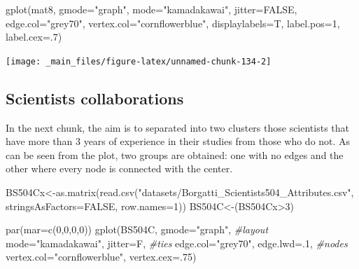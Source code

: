\documentclass[
  notitlepage,
  onecolumn,
  openany]{book}
\newenvironment{Shaded}{\begin{snugshade}}{\end{snugshade}}
\newcommand{\AttributeTok}[1]{\textcolor[rgb]{0.77,0.63,0.00}{#1}}
\newcommand{\CommentTok}[1]{\textcolor[rgb]{0.56,0.35,0.01}{\textit{#1}}}
\newcommand{\ConstantTok}[1]{\textcolor[rgb]{0.00,0.00,0.00}{#1}}
\newcommand{\DecValTok}[1]{\textcolor[rgb]{0.00,0.00,0.81}{#1}}
\newcommand{\FunctionTok}[1]{\textcolor[rgb]{0.00,0.00,0.00}{#1}}
\newcommand{\NormalTok}[1]{#1}
\newcommand{\OtherTok}[1]{\textcolor[rgb]{0.56,0.35,0.01}{#1}}
\newcommand{\SpecialCharTok}[1]{\textcolor[rgb]{0.00,0.00,0.00}{#1}}
\newcommand{\StringTok}[1]{\textcolor[rgb]{0.31,0.60,0.02}{#1}}
\begin{document}
\begin{Shaded}
\begin{Highlighting}[]
\FunctionTok{gplot}\NormalTok{(mat8, }
      \AttributeTok{gmode=}\StringTok{"graph"}\NormalTok{,}
      \AttributeTok{mode=}\StringTok{"kamadakawai"}\NormalTok{,}
      \AttributeTok{jitter=}\ConstantTok{FALSE}\NormalTok{,}
      \AttributeTok{edge.col=}\StringTok{"grey70"}\NormalTok{,}
      \AttributeTok{vertex.col=}\StringTok{"cornflowerblue"}\NormalTok{,}
      \AttributeTok{displaylabels=}\NormalTok{T,}
      \AttributeTok{label.pos=}\DecValTok{1}\NormalTok{,}
      \AttributeTok{label.cex=}\NormalTok{.}\DecValTok{7}\NormalTok{)}
\end{Highlighting}
\end{Shaded}

\begin{center}\texttt{[image: \_main\_files/figure-latex/unnamed-chunk-134-2]} \end{center}

\hypertarget{scientists-collaborations}{%
\subsection{Scientists collaborations}\label{scientists-collaborations}}

In the next chunk, the aim is to separated into two clusters those scientists that have more than 3 years of experience in their studies from those who do not. As can be seen from the plot, two groups are obtained: one with no edges and the other where every node is connected with the center.

\begin{Shaded}
\begin{Highlighting}[]
\NormalTok{BS504Cx}\OtherTok{\textless{}{-}}\FunctionTok{as.matrix}\NormalTok{(}\FunctionTok{read.csv}\NormalTok{(}\StringTok{"datasets/Borgatti\_Scientists504\_Attributes.csv"}\NormalTok{,}
                            \AttributeTok{stringsAsFactors=}\ConstantTok{FALSE}\NormalTok{, }\AttributeTok{row.names=}\DecValTok{1}\NormalTok{))}
\NormalTok{BS504C}\OtherTok{\textless{}{-}}\NormalTok{(BS504Cx}\SpecialCharTok{\textgreater{}}\DecValTok{3}\NormalTok{)}

\FunctionTok{par}\NormalTok{(}\AttributeTok{mar=}\FunctionTok{c}\NormalTok{(}\DecValTok{0}\NormalTok{,}\DecValTok{0}\NormalTok{,}\DecValTok{0}\NormalTok{,}\DecValTok{0}\NormalTok{))}
\FunctionTok{gplot}\NormalTok{(BS504C, }
      \AttributeTok{gmode=}\StringTok{"graph"}\NormalTok{,}
      \CommentTok{\#layout}
      \AttributeTok{mode=}\StringTok{"kamadakawai"}\NormalTok{,}
      \AttributeTok{jitter=}\NormalTok{F,}
      \CommentTok{\#ties}
      \AttributeTok{edge.col=}\StringTok{"grey70"}\NormalTok{, }
      \AttributeTok{edge.lwd=}\NormalTok{.}\DecValTok{1}\NormalTok{,}
      \CommentTok{\#nodes}
      \AttributeTok{vertex.col=}\StringTok{"cornflowerblue"}\NormalTok{,}
      \AttributeTok{vertex.cex=}\NormalTok{.}\DecValTok{75}\NormalTok{)}
\end{Highlighting}
\end{Shaded}
\end{document}
